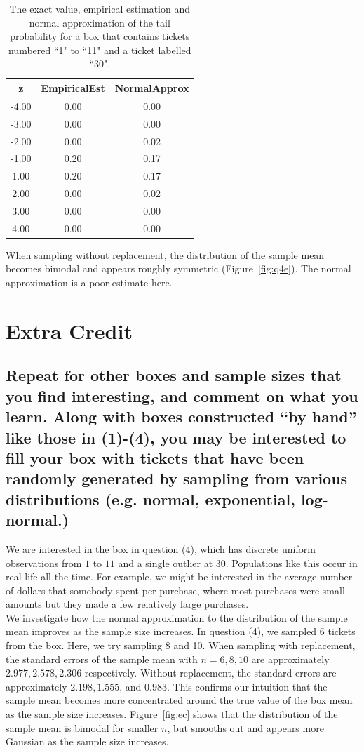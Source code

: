 \documentclass[11pt]{article}
\begin{document}
\begin{table}[H]
\centering
\begin{tabular}{|c|cc|}
  \hline
z & EmpiricalEst & NormalApprox \\ 
  \hline
-4.00 & 0.00 & 0.00 \\ 
  -3.00 & 0.00 & 0.00 \\ 
  -2.00 & 0.00 & 0.02 \\ 
  -1.00 & 0.20 & 0.17 \\ 
  1.00 & 0.20 & 0.17 \\ 
  2.00 & 0.00 & 0.02 \\ 
  3.00 & 0.00 & 0.00 \\ 
  4.00 & 0.00 & 0.00 \\ 
   \hline
\end{tabular}
\caption{The exact value, empirical estimation and normal approximation of the tail probability for a box that contains tickets numbered ``1" to ``11" and a ticket labelled ``30".} \label{tab:q4e}
\end{table}


\noindent When sampling without replacement, the distribution of the sample mean becomes bimodal and appears roughly symmetric (Figure~\ref{fig:q4e}).  The normal approximation is a poor estimate here.


\pagebreak

\section*{Extra Credit}
\subsection*{Repeat for other boxes and sample sizes that you find interesting, and comment on what you learn. Along with boxes constructed ``by hand'' like those in (1)-(4), you may be interested to fill your box with tickets that have been randomly generated by sampling from various distributions (e.g. normal, exponential, log-normal.)}

We are interested in the box in question (4), which has discrete uniform observations from $1$ to $11$ and a single outlier at $30$.  Populations like this occur in real life all the time.  For example, we might be interested in the average number of dollars that somebody spent per purchase, where most purchases were small amounts but they made a few relatively large purchases. \\

\noindent We investigate how the normal approximation to the distribution of the sample mean improves as the sample size increases.  In question (4), we sampled 6 tickets from the box.  Here, we try sampling 8 and 10.  When sampling with replacement, the standard errors of the sample mean with $n=6, 8, 10$ are approximately $2.977, 2.578, 2.306$ respectively.  Without replacement, the standard errors are approximately $2.198,1.555$, and $0.983$.  This confirms our intuition that the sample mean becomes more concentrated around the true value of the box mean as the sample size increases.  Figure~\ref{fig:ec} shows that the distribution of the sample mean is bimodal for smaller $n$, but smooths out and appears more Gaussian as the sample size increases.
\end{document}
